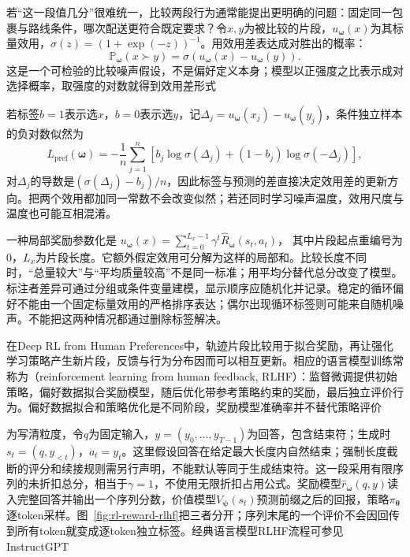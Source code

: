 若“这一段值几分”很难统一，比较两段行为通常能提出更明确的问题：固定同一包裹与路线条件，哪次配送更符合既定要求？令$x,y$为被比较的片段，$u_{\bm{\omega}}(x)$为其标量效用，$\sigma(z)=(1+\exp(-z))^{-1}$。用效用差表达成对胜出的概率：
\begin{equation}
  \mathbb P_{\bm{\omega}}(x\succ y)
    =\sigma\!\left(u_{\bm{\omega}}(x)-u_{\bm{\omega}}(y)\right).
  \label{eq:rl-reward-bt}
\end{equation}
这是一个可检验的比较噪声假设，不是偏好定义本身；模型以正强度之比表示成对选择概率，取强度的对数就得到效用差形式

若标签$b=1$表示选$x$，$b=0$表示选$y$，记$\Delta_j=u_{\bm{\omega}}(x_j)-u_{\bm{\omega}}(y_j)$，条件独立样本的负对数似然为
\begin{equation}
  L_{\mathrm{pref}}(\bm{\omega})
  =-\frac1n\sum_{j=1}^n
    \left[b_j\log\sigma(\Delta_j)
      +(1-b_j)\log\sigma(-\Delta_j)\right],
  \label{eq:rl-reward-bt-loss}
\end{equation}
对$\Delta_j$的导数是$(\sigma(\Delta_j)-b_j)/n$，因此标签与预测的差直接决定效用差的更新方向。把两个效用都加同一常数不会改变似然；若还同时学习噪声温度，效用尺度与温度也可能互相混淆。

一种局部奖励参数化是
$u_{\bm{\omega}}(x)=\sum_{t=0}^{L_x-1}\gamma^t
\widehat R_{\bm{\omega}}(s_t,a_t)$，
其中片段起点重编号为0，$L_x$为片段长度。它额外假定效用可分解为这样的局部和。比较长度不同时，“总量较大”与“平均质量较高”不是同一标准；用平均分替代总分改变了模型。标注者差异可通过分组或条件变量建模，显示顺序应随机化并记录。稳定的循环偏好不能由一个固定标量效用的严格排序表达；偶尔出现循环标签则可能来自随机噪声。不能把这两种情况都通过删除标签解决。

在Deep RL from Human Preferences中，轨迹片段比较用于拟合奖励，再让强化学习策略产生新片段，反馈与行为分布因而可以相互更新。相应的语言模型训练常称为（reinforcement learning from human feedback, RLHF）：监督微调提供初始策略，偏好数据拟合奖励模型，随后优化带参考策略约束的奖励，最后独立评价行为。偏好数据拟合和策略优化是不同阶段，奖励模型准确率并不替代策略评价

为写清粒度，令$q$为固定输入，$y=(y_0,\ldots,y_{T-1})$为回答，包含结束符；生成时$s_t=(q,y_{<t})$，$a_t=y_t$。这里假设回答在给定最大长度内自然结束；强制长度截断的评分和续接规则需另行声明，不能默认等同于生成结束符。这一段采用有限序列的未折扣总分，相当于$\gamma=1$，不使用无限折扣占用公式。奖励模型$\widehat r_{\bm{\omega}}(q,y)$读入完整回答并输出一个序列分数，价值模型$V_{\bm{\psi}}(s_t)$预测前缀之后的回报，策略$\pi_{\bm{\theta}}$逐token采样。图~\ref{fig:rl-reward-rlhf}把三者分开；序列末尾的一个评价不会因回传到所有token就变成逐token独立标签。经典语言模型RLHF流程可参见InstructGPT

